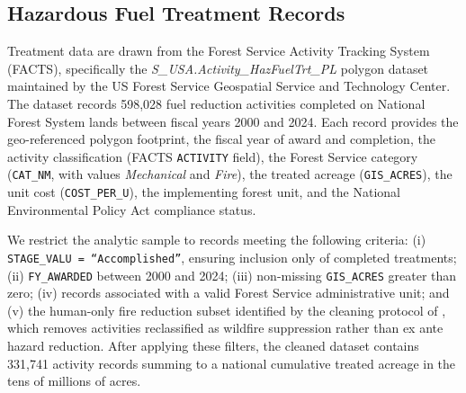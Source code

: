 \documentclass[12pt, letterpaper]{article}
\begin{document}
\subsection{Hazardous Fuel Treatment Records}

Treatment data are drawn from the Forest Service Activity Tracking System (FACTS), specifically the \textit{S\_USA.Activity\_HazFuelTrt\_PL} polygon dataset maintained by the US Forest Service Geospatial Service and Technology Center. The dataset records 598,028 fuel reduction activities completed on National Forest System lands between fiscal years 2000 and 2024. Each record provides the geo-referenced polygon footprint, the fiscal year of award and completion, the activity classification (FACTS \texttt{ACTIVITY} field), the Forest Service category (\texttt{CAT\_NM}, with values \textit{Mechanical} and \textit{Fire}), the treated acreage (\texttt{GIS\_ACRES}), the unit cost (\texttt{COST\_PER\_U}), the implementing forest unit, and the National Environmental Policy Act compliance status.

We restrict the analytic sample to records meeting the following criteria: (i) \texttt{STAGE\_VALU = ``Accomplished''}, ensuring inclusion only of completed treatments; (ii) \texttt{FY\_AWARDED} between 2000 and 2024; (iii) non-missing \texttt{GIS\_ACRES} greater than zero; (iv) records associated with a valid Forest Service administrative unit; and (v) the human-only fire reduction subset identified by the cleaning protocol of \citet{wear2025}, which removes activities reclassified as wildfire suppression rather than ex ante hazard reduction. After applying these filters, the cleaned dataset contains 331,741 activity records summing to a national cumulative treated acreage in the tens of millions of acres.
\end{document}
